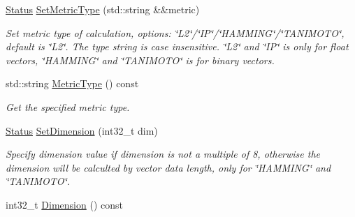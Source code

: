 \begin{DoxyCompactItemize}
\mbox{\label{classmilvus_1_1_calc_distance_arguments_ac8cc5ef70d425a599fec7fc20dc26af2}} 
\hyperlink{classmilvus_1_1_status}{Status} \hyperlink{classmilvus_1_1_calc_distance_arguments_ac8cc5ef70d425a599fec7fc20dc26af2}{Set\+Metric\+Type} (std\+::string \&\&metric)
\begin{DoxyCompactList}\small\item\em Set metric type of calculation, options\+: \char`\"{}\+L2\char`\"{}/\char`\"{}\+I\+P\char`\"{}/\char`\"{}\+H\+A\+M\+M\+I\+N\+G\char`\"{}/\char`\"{}\+T\+A\+N\+I\+M\+O\+T\+O\char`\"{}, default is \char`\"{}\+L2\char`\"{}. The type string is case insensitive. \char`\"{}\+L2\char`\"{} and \char`\"{}\+I\+P\char`\"{} is only for float vectors, \char`\"{}\+H\+A\+M\+M\+I\+N\+G\char`\"{} and \char`\"{}\+T\+A\+N\+I\+M\+O\+T\+O\char`\"{} is for binary vectors. \end{DoxyCompactList}\item 
\mbox{\label{classmilvus_1_1_calc_distance_arguments_af5e2a03eb0f1160b33094ae43e8eef19}} 
std\+::string \hyperlink{classmilvus_1_1_calc_distance_arguments_af5e2a03eb0f1160b33094ae43e8eef19}{Metric\+Type} () const
\begin{DoxyCompactList}\small\item\em Get the specified metric type. \end{DoxyCompactList}\item 
\mbox{\label{classmilvus_1_1_calc_distance_arguments_a2e834af0540d636c428640502a165e6f}} 
\hyperlink{classmilvus_1_1_status}{Status} \hyperlink{classmilvus_1_1_calc_distance_arguments_a2e834af0540d636c428640502a165e6f}{Set\+Dimension} (int32\+\_\+t dim)
\begin{DoxyCompactList}\small\item\em Specify dimension value if dimension is not a multiple of 8, otherwise the dimension will be calculted by vector data length, only for \char`\"{}\+H\+A\+M\+M\+I\+N\+G\char`\"{} and \char`\"{}\+T\+A\+N\+I\+M\+O\+T\+O\char`\"{}. \end{DoxyCompactList}\item 
\mbox{\label{classmilvus_1_1_calc_distance_arguments_aa74c643ffc308d96dff399970ae7dece}} 
int32\+\_\+t \hyperlink{classmilvus_1_1_calc_distance_arguments_aa74c643ffc308d96dff399970ae7dece}{Dimension} () const

\end{DoxyCompactItemize}
